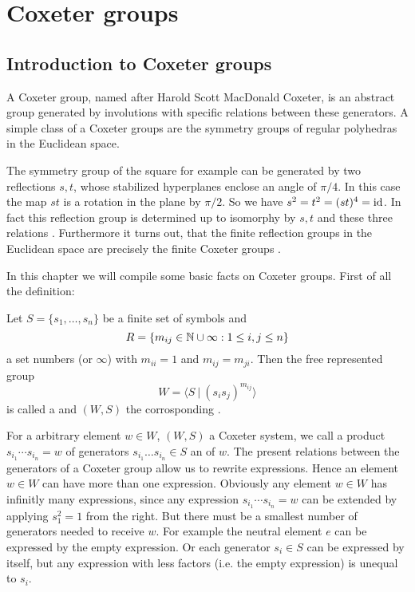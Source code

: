 \section{Coxeter groups}

\subsection{Introduction to Coxeter groups}

A Coxeter group, named after Harold Scott MacDonald Coxeter, is an abstract group generated by involutions with specific relations between these generators. A simple class of a Coxeter groups are the symmetry groups of regular polyhedras in the Euclidean space.

The symmetry group of the square for example can be generated by two reflections $s,t$, whose stabilized hyperplanes enclose an angle of $\pi / 4$. In this case the map $st$ is a rotation in the plane by $\pi / 2$. So we have $s^2 = t^2 = (st)^4 = \operatorname{id}$. In fact this reflection group is determined up to isomorphy by $s,t$ and these three relations \cite[Theorem 1.9]{humphreys:coxeter}. Furthermore it turns out, that the finite reflection groups in the Euclidean space are precisely the finite Coxeter groups \cite[Theorem 6.4]{humphreys:coxeter}.

In this chapter we will compile some basic facts on Coxeter groups. First of all the definition:

\begin{defi}
	\label{coxeter-system}
	Let $S = \{ s_1, \ldots, s_n \}$ be a finite set of symbols and
	$$R = \{ m_{ij} \in \mathbb{N} \cup \infty : 1 \leq i,j \leq n \}$$
	a set numbers (or $\infty$) with $m_{ii} = 1$ and $m_{ij} = m_{ji}$. Then the free represented group
	$$W = \langle S \ | \ (s_i s_j)^{m_{ij}} \rangle$$
	is called a  and $(W,S)$ the corrosponding .
\end{defi}

For a arbitrary element $w \in W$, $(W,S)$ a Coxeter system, we call a product $s_{i_1} \cdots s_{i_n} = w$ of generators $s_{i_1} \ldots s_{i_n} \in S$ an  of $w$. The present relations between the generators of a Coxeter group allow us to rewrite expressions. Hence an element $w \in W$ can have more than one expression. Obviously any element $w \in W$ has infinitly many expressions, since any expression $s_{i_1} \cdots s_{i_n} = w$ can be extended by applying $s_1^2 = 1$ from the right. But there must be a smallest number of generators needed to receive $w$. For example the neutral element $e$ can be expressed by the empty expression. Or each generator $s_i \in S$ can be expressed by itself, but any expression with less factors (i.e. the empty expression) is unequal to $s_i$.

